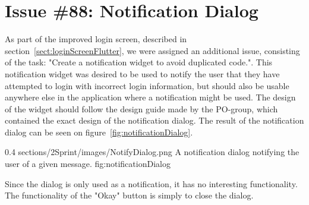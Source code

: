 \section{Issue \#88: Notification Dialog}
\label{sect:NotifyDialog}
As part of the improved login screen, described in section~\ref{sect:loginScreenFlutter}, we were assigned an additional issue, consisting of the task: "Create a notification widget to avoid duplicated code.". 
This notification widget was desired to be used to notify the user that they have attempted to login with incorrect login information, but should also be usable anywhere else in the application where a notification might be used.
The design of the widget should follow the design guide made by the PO-group, which contained the exact design of the notification dialog. 
The result of the notification dialog can be seen on figure~\ref{fig:notificationDialog}.

        {0.4} %
        {sections/2Sprint/images/NotifyDialog.png} %
        {A notification dialog notifying the user of a given message.} %
        {fig:notificationDialog} %
        
Since the dialog is only used as a notification, it has no interesting functionality. The functionality of the "Okay" button is simply to close the dialog.